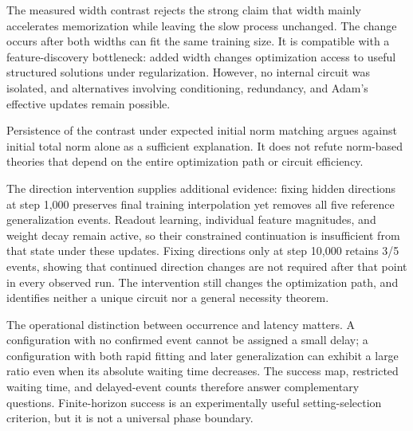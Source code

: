 The measured width contrast rejects the strong claim that width mainly accelerates memorization while leaving the slow process unchanged. The change occurs after both widths can fit the same training size. It is compatible with a feature-discovery bottleneck: added width changes optimization access to useful structured solutions under regularization. However, no internal circuit was isolated, and alternatives involving conditioning, redundancy, and Adam's effective updates remain possible.

Persistence of the contrast under expected initial norm matching argues against initial total norm alone as a sufficient explanation. It does not refute norm-based theories that depend on the entire optimization path or circuit efficiency.

The direction intervention supplies additional evidence: fixing hidden directions at step 1,000 preserves final training interpolation yet removes all five reference generalization events. Readout learning, individual feature magnitudes, and weight decay remain active, so their constrained continuation is insufficient from that state under these updates. Fixing directions only at step 10,000 retains 3/5 events, showing that continued direction changes are not required after that point in every observed run. The intervention still changes the optimization path, and identifies neither a unique circuit nor a general necessity theorem.

The operational distinction between occurrence and latency matters. A configuration with no confirmed event cannot be assigned a small delay; a configuration with both rapid fitting and later generalization can exhibit a large ratio even when its absolute waiting time decreases. The success map, restricted waiting time, and delayed-event counts therefore answer complementary questions. Finite-horizon success is an experimentally useful setting-selection criterion, but it is not a universal phase boundary.
